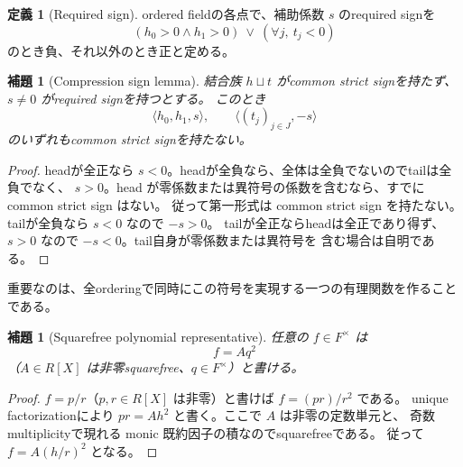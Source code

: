 \documentclass[uplatex,dvipdfmx]{jsarticle}
\newtheorem{lemma}[theorem]{補題}
\theoremstyle{definition}
\newtheorem{definition}[theorem]{定義}
\theoremstyle{remark}
\begin{document}
\begin{definition}[Required sign]\label{def:reqsign-ja}
ordered fieldの各点で、補助係数 $s$ のrequired signを
\[
  (h_0>0\land h_1>0)\ \lor\ (\forall j,\ t_j<0)
\]
のとき負、それ以外のとき正と定める。
\end{definition}

\begin{lemma}[Compression sign lemma]\label{lem:compress-sign-ja}
結合族 $h\sqcup t$ がcommon strict signを持たず、$s\ne0$ がrequired signを持つとする。
このとき
\[
  \langle h_0,h_1,s\rangle,
  \qquad
  \langle (t_j)_{j\in J},-s\rangle
\]
のいずれもcommon strict signを持たない。
\end{lemma}
\begin{proof}
headが全正なら $s<0$。headが全負なら、全体は全負でないのでtailは全負でなく、
$s>0$。head が零係数または異符号の係数を含むなら、すでに common strict sign はない。
従って第一形式は common strict sign を持たない。tailが全負なら $s<0$ なので $-s>0$。
tailが全正ならheadは全正であり得ず、$s>0$ なので $-s<0$。tail自身が零係数または異符号を
含む場合は自明である。
\end{proof}

重要なのは、全orderingで同時にこの符号を実現する一つの有理関数を作ることである。

\begin{lemma}[Squarefree polynomial representative]\label{lem:squarefree-normal-ja}
任意の $f\in F^\times$ は
\[
  f=Aq^2
\]
（$A\in R[X]$ は非零squarefree、$q\in F^\times$）と書ける。
\end{lemma}
\begin{proof}
$f=p/r$（$p,r\in R[X]$ は非零）と書けば $f=(pr)/r^2$ である。
unique factorizationにより $pr=Ah^2$ と書く。ここで $A$ は非零の定数単元と、
奇数multiplicityで現れる monic 既約因子の積なのでsquarefreeである。
従って $f=A(h/r)^2$ となる。
\end{proof}
\end{document}
